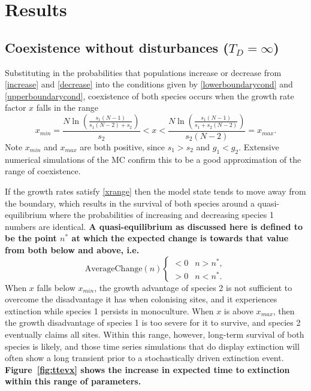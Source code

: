 \section{Results} \label{results}
\subsection{Coexistence without disturbances ($T_D=\infty$)}
\label{ss:resultshomo}

Substituting in the probabilities that populations increase or decrease from \eqref{increase} and \eqref{decrease} into the conditions given by \eqref{lowerboundarycond} and \eqref{upperboundarycond}, coexistence of both species occurs when the growth rate factor $x$ falls in the range
\begin{equation}
\label{xrange}
x_{min}=\frac{N\ln\left(\frac{s_1(N-1)}{s_1(N-2)+s_2}\right)}{s_2}<x<\frac{N\ln\left(\frac{s_1(N-1)}{s_1+s_2(N-2)}\right)}{s_2(N-2)}=x_{max}.
\end{equation}
Note $x_{min}$ and $x_{max}$ are both positive, since $s_1>s_2$ and $g_1<g_2$.  Extensive numerical simulations of the MC confirm this to be a good approximation of the range of coexistence.

If the growth rates satisfy \eqref{xrange} then the model state tends to move away from the boundary, which results in  the survival of both species around a quasi-equilibrium where the probabilities of increasing and decreasing species 1 numbers are identical. \textbf{A quasi-equilibrium as discussed here is defined to be the point $n^*$ at which the expected change is towards that value from both below and above, i.e.}
\begin{equation}
\text{AverageChange}(n)\begin{cases}
<0 & n>n^*, \\
>0 & n<n^*. \end{cases} \end{equation}
 When $x$ falls below $x_{min}$, the growth advantage of species 2 is not sufficient to overcome the disadvantage it has when colonising sites, and it experiences extinction while species 1 persists in monoculture. When $x$ is above $x_{max}$, then the growth disadvantage of species 1 is too severe for it to survive, and species 2 eventually claims all sites. Within this range, however, long-term survival of both species is likely, and those time series simulations that do display extinction will often show a long transient prior to a stochastically driven extinction event. \textbf{Figure~\ref{fig:ttevx} shows the increase in expected time to extinction within this range of parameters.}

